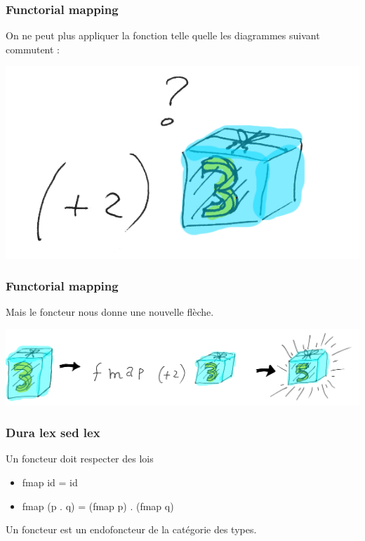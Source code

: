 \documentclass{beamer}
\begin{document}
\begin{frame}
\frametitle{Functorial mapping}
On ne peut plus appliquer la fonction telle quelle les diagrammes suivant commutent :

\begin{center}
\includegraphics[scale=0.3]{wrong_type.png}
\end{center}
\end{frame}

\begin{frame}
\frametitle{Functorial mapping}
Mais le foncteur nous donne une nouvelle flèche.
\begin{center}
\includegraphics[scale=0.19]{f_fct.png}
\end{center}
\end{frame}



\begin{frame}
\frametitle{Dura lex sed lex}
\begin{alertblock}{Un foncteur doit respecter des lois}
\begin{itemize}
\item fmap id = id
\item fmap (p . q) = (fmap p) . (fmap q)

\end{itemize}
\end{alertblock}

\pause
Un foncteur est un endofoncteur de la catégorie des types.
\end{frame}
\end{document}

